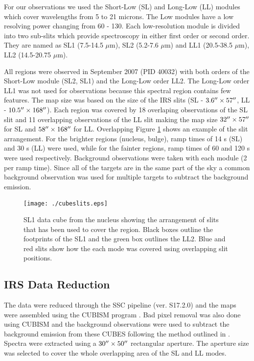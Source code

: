 \documentclass[useAMS,usenatbib,a4paper]{mn2e}
\begin{document}
For our observations we used the Short-Low (SL) and Long-Low (LL) modules which cover wavelengths from 5 to 21 microns. The Low modules have a low resolving power changing from 60 - 130. Each low-resolution module is divided into two sub-slits which provide spectroscopy in either first order or second order. They are named as SL1 (7.5-14.5 $\mu$m), SL2 (5.2-7.6 $\mu$m) and LL1 (20.5-38.5 $\mu$m), LL2 (14.5-20.75 $\mu$m).

All regions were observed in September 2007 (PID 40032) with both orders of the Short-Low module (SL2, SL1) and the Long-Low order LL2. The Long-Low order LL1 was not used for observations because this spectral region contains few features. The map size was based on the size of the IRS slits (SL - $3.6\hbox{$^{\prime\prime}$} \times 57\hbox{$^{\prime\prime}$}$, LL - $10.5\hbox{$^{\prime\prime}$} \times 168\hbox{$^{\prime\prime}$}$). Each region was covered by 18 overlaping observations of the SL slit and 11 overlapping observations of the LL slit making the map size $32\hbox{$^{\prime\prime}$} \times 57\hbox{$^{\prime\prime}$}$ for SL and $58\hbox{$^{\prime\prime}$} \times 168\hbox{$^{\prime\prime}$}$ for LL. Overlapping Figure \ref{slits} shows an example of the slit arrangement. For the brighter regions (nucleus, bulge), ramp times of 14 s (SL) and 30 s (LL) were used, while for the fainter regions, ramp times of 60 and 120 s were used respectively. Background observations were taken with each module (2 per ramp time). Since all of the targets are in the same part of the sky a common background observation was used for multiple targets to subtract the background emission. 


\begin{figure}
\centering
\texttt{[image: ./cubeslits.eps]}
\caption{SL1 data cube from the nucleus showing the arrangement of slits that has been used to cover the region. Black boxes outline the footprints of the SL1 and the green box outlines the LL2. Blue and red slits show how the each mode was covered using overlapping slit positions.}
\label{slits}
\end{figure}

\subsection{IRS Data Reduction}

The data were reduced through the SSC pipeline (ver. S17.2.0) and the maps were assembled using the CUBISM program \citep{Smith:2007fk}. Bad pixel removal was also done using CUBISM and the background observations were used to subtract the background emission from these CUBES following the method outlined in \citet{Gordon:2008lr}. Spectra were extracted using a $30\hbox{$^{\prime\prime}$}\times50\hbox{$^{\prime\prime}$}$   rectangular aperture. The aperture size was selected to cover the whole overlapping area of the SL and LL modes.
\end{document}
